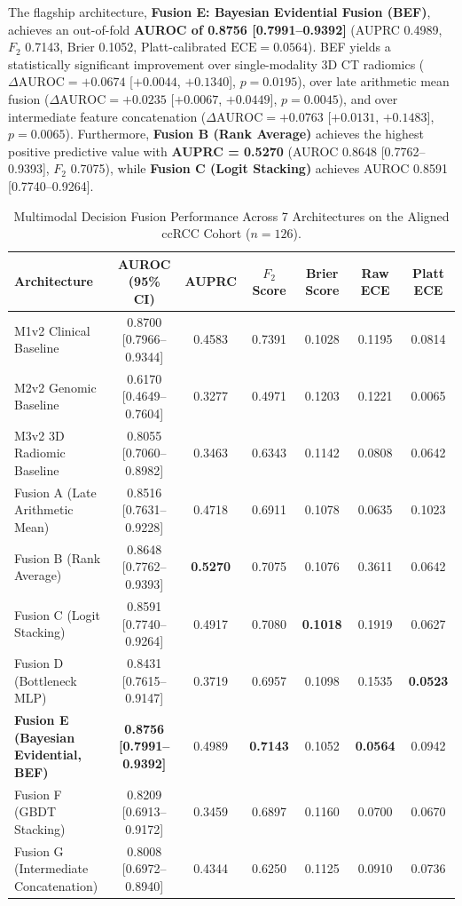 The flagship architecture, \textbf{Fusion E: Bayesian Evidential Fusion (BEF)}, achieves an out-of-fold \textbf{AUROC of 0.8756 [0.7991--0.9392]} (AUPRC 0.4989, $F_2$ 0.7143, Brier 0.1052, Platt-calibrated $\text{ECE} = 0.0564$). BEF yields a statistically significant improvement over single-modality 3D CT radiomics ($\Delta\text{AUROC} = +0.0674$ [$+0.0044$, $+0.1340$], $p = 0.0195$), over late arithmetic mean fusion ($\Delta\text{AUROC} = +0.0235$ [$+0.0067$, $+0.0449$], $p = 0.0045$), and over intermediate feature concatenation ($\Delta\text{AUROC} = +0.0763$ [$+0.0131$, $+0.1483$], $p = 0.0065$). Furthermore, \textbf{Fusion B (Rank Average)} achieves the highest positive predictive value with \textbf{AUPRC = 0.5270} (AUROC 0.8648 [0.7762--0.9393], $F_2$ 0.7075), while \textbf{Fusion C (Logit Stacking)} achieves AUROC 0.8591 [0.7740--0.9264].

\begin{table}[t]
\centering
\caption{Multimodal Decision Fusion Performance Across 7 Architectures on the Aligned ccRCC Cohort ($n = 126$).}
\label{tab:fusion_performance}
\small
\renewcommand{\arraystretch}{0.95}
\setlength{\tabcolsep}{5pt}
\begin{tabularx}{\textwidth}{@{} L C C C C C C @{}}
\toprule
\textbf{Architecture} & \textbf{AUROC (95\% CI)} & \textbf{AUPRC} & \textbf{$F_2$ Score} & \textbf{Brier Score} & \textbf{Raw ECE} & \textbf{Platt ECE} \\
\midrule
M1v2 Clinical Baseline & 0.8700 [0.7966--0.9344] & 0.4583 & 0.7391 & 0.1028 & 0.1195 & 0.0814 \\
M2v2 Genomic Baseline  & 0.6170 [0.4649--0.7604] & 0.3277 & 0.4971 & 0.1203 & 0.1221 & 0.0065 \\
M3v2 3D Radiomic Baseline & 0.8055 [0.7060--0.8982] & 0.3463 & 0.6343 & 0.1142 & 0.0808 & 0.0642 \\
\midrule
Fusion A (Late Arithmetic Mean) & 0.8516 [0.7631--0.9228] & 0.4718 & 0.6911 & 0.1078 & 0.0635 & 0.1023 \\
Fusion B (Rank Average) & 0.8648 [0.7762--0.9393] & \textbf{0.5270} & 0.7075 & 0.1076 & 0.3611 & 0.0642 \\
Fusion C (Logit Stacking) & 0.8591 [0.7740--0.9264] & 0.4917 & 0.7080 & \textbf{0.1018} & 0.1919 & 0.0627 \\
Fusion D (Bottleneck MLP) & 0.8431 [0.7615--0.9147] & 0.3719 & 0.6957 & 0.1098 & 0.1535 & \textbf{0.0523} \\
\textbf{Fusion E (Bayesian Evidential, BEF)} & \textbf{0.8756 [0.7991--0.9392]} & 0.4989 & \textbf{0.7143} & 0.1052 & \textbf{0.0564} & 0.0942 \\
Fusion F (GBDT Stacking) & 0.8209 [0.6913--0.9172] & 0.3459 & 0.6897 & 0.1160 & 0.0700 & 0.0670 \\
Fusion G (Intermediate Concatenation) & 0.8008 [0.6972--0.8940] & 0.4344 & 0.6250 & 0.1125 & 0.0910 & 0.0736 \\
\bottomrule
\end{tabularx}
\end{table}

